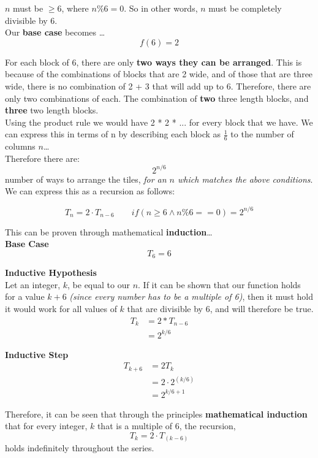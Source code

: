 \documentclass[12pt]{article}
\begin{document}
\begin{answer}
$n$ must be $\geq 6$, where $ n \% 6 = 0$. So in other words, $n$ must be completely divisible by 6. \\
Our \textbf{base case} becomes \dots
$$ f(6) = 2 $$

For each block of 6, there are only \textbf{two ways they can be arranged}. This is because of the combinations of blocks that are 2 wide, and of those that are three wide, there is no combination of 2 + 3 that will add up to 6. Therefore, there are only two combinations of each. The combination of \textbf{two} three length blocks, and \textbf{three} two length blocks.\\

Using the product rule we would have 2 * 2 * ... for every block that we have. We can express this in terms of n by describing each block as $\frac{1}{6}$ to the number of columns $n$\dots 
\\
Therefore there are:
$$ 2^{n/6} $$ number of ways to arrange the tiles, \textit{for an $n$ which matches the above conditions}. \\

We can express this as a recursion as follows:

$$ T_{n} = 2\cdot T_{n-6} \qquad if(n\geq 6 \land n\%6==0) = 2^{n/6}$$

This can be proven through mathematical \textbf{induction}\dots \\

\textbf{Base Case}
$$T_{6} = 6$$

\textbf{Inductive Hypothesis} \\
Let an integer, $k$, be equal to our $n$. If it can be shown that our function holds for a value $k+6$ \textit{(since every number has to be a multiple of 6)}, then it must hold it would work for all values of $k$ that are divisible by 6, and will therefore be true.  
\begin{align*}
T_{k}
&= 2 * T_{n-6} \\
&= 2^{k/6}
\end{align*}

\textbf{Inductive Step}
\begin{align*}
T_{k+6} &= 2 T_{k} \\
        &= 2\cdot 2^{(k/6)} \\
        &= 2^{k/6 + 1}
\end{align*}

Therefore, it can be seen that through the principles \textbf{mathematical induction} that for every integer, $k$ that is a multiple of $6$, the recursion, 
$$T_{k} = 2\cdot T_{(k-6)}$$ holds indefinitely throughout the series.\\
\end{answer}
\end{document}
